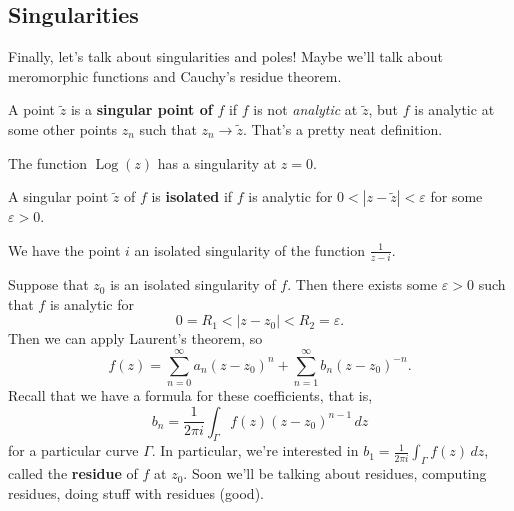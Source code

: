 \subsection{Singularities}
Finally, let's talk about singularities and poles! Maybe we'll talk about meromorphic functions and Cauchy's residue theorem.
\begin{definition}[Singularities]
    A point $\widetilde z$ is a \textbf{singular point of} $f$ if $f$ is not \emph{analytic} at $\widetilde z$, but $f$ is analytic at some other points $z_n $ such that $z_n \to \widetilde z$. That's a pretty neat definition.
\end{definition}
\begin{example}
    The function $\operatorname{Log}(z)$ has a singularity at $z=0$.
\end{example}
\begin{definition}[]
    A singular point $\widetilde z$ of $f$ is \textbf{isolated} if $f$ is analytic for $0<|z-\widetilde z|<\varepsilon $ for some $\varepsilon >0$.
\end{definition}
\begin{example}
    We have the point $i$ an isolated singularity of the function $\frac{1}{z-i}$.
\end{example}
Suppose that $z_0$ is an isolated singularity of $f$. Then there exists some $\varepsilon >0$ such that $f$ is analytic for \[
0=R_1<|z-z_0|<R_2=\varepsilon .
\] Then we can apply Laurent's theorem, so \[
f(z)=\sum_{n=0}^{\infty} a_n (z-z_0)^n +\sum_{n=1}^{\infty} b_n (z-z_0)^{-n}.
\] Recall that we have a formula for these coefficients, that is, \[
b_n =\frac{1}{2\pi i}\int_{\Gamma }^{} f(z)(z-z_0)^{n-1} \, dz
\] for a particular curve $\Gamma $. In particular, we're interested in $b_1=\frac{1}{2\pi i}\int_{\Gamma}^{} f(z) \, dz$, called the \textbf{residue} of $f$ at $z_0$. Soon we'll be talking about residues, computing residues, doing stuff with residues (good). 
